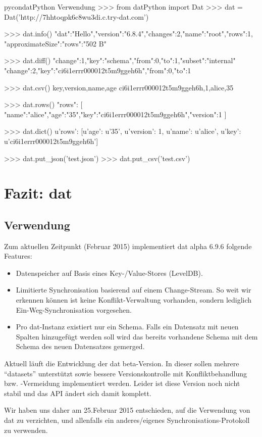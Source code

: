 \begin{srclst}{pycon}{datPython Verwendung}
>>> from datPython import Dat
>>> dat = Dat('http://7hhtoqpk6c8wu3di.c.try-dat.com')

>>> dat.info()
{"dat":"Hello","version":"6.8.4","changes":2,"name":"root","rows":1, "approximateSize":{"rows":"502 B"}}

>>> dat.diff()
{"change":1,"key":"schema","from":0,"to":1,"subset":"internal"}
{"change":2,"key":"ci6i1errr000012t5m9ggeh6h","from":0,"to":1}

>>> dat.csv()
key,version,name,age
ci6i1errr000012t5m9ggeh6h,1,alice,35

>>> dat.rows()
{"rows": [
	{"name":"alice","age":"35","key":"ci6i1errr000012t5m9ggeh6h","version":1}
	]}

>>> dat.dict()
{u'rows': [{u'age': u'35', u'version': 1, u'name': u'alice', u'key': u'ci6i1errr000012t5m9ggeh6h'}]}

>>> dat.put_json('test.json')
>>> dat.put_csv('test.csv')
\end{srclst}

\chapter{Fazit: dat}
\section{Verwendung}
Zum aktuellen Zeitpunkt (Februar 2015) implementiert dat alpha 6.9.6 folgende Features:
\begin{itemize}
\item Datenspeicher auf Basis eines Key-/Value-Stores (LevelDB).
\item Limitierte Synchronisation basierend auf einem Change-Stream. So weit wir erkennen können ist keine Konflikt-Verwaltung vorhanden, sondern lediglich Ein-Weg-Synchronisation vorgesehen.
\item Pro dat-Instanz existiert nur ein Schema. Falls ein Datensatz mit neuen Spalten hinzugefügt werden soll wird das bereits vorhandene Schema mit dem Schema des neuen Datensatzes gemerged.
\end{itemize}

Aktuell läuft die Entwicklung der dat beta-Version. In dieser sollen mehrere ``datasets'' unterstützt sowie bessere Versionskontrolle mit Konfliktbehandlung bzw. -Vermeidung implementiert werden. Leider ist diese Version noch nicht stabil und das API ändert sich damit komplett.

Wir haben uns daher am 25.Februar 2015 entschieden, auf die Verwendung von dat zu verzichten, und allenfalls ein anderes/eigenes Synchronisations-Protokoll zu verwenden.
